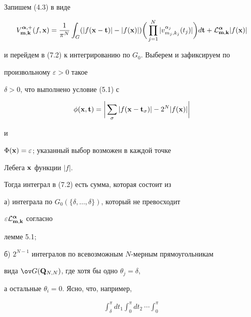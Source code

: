 \begin{pf}


Запишем (4.3) в виде


\begin{equation}


V^{{\boldsymbol {\alpha}},+}_{{\bold m},{\bold k}}(f,{\bold x})


=\frac{1}{\pi^N}\int_G (|f({\bold x}-{\bold t})|-|f({\bold x})|)


\bigg(\prod_{j=1}^N |v_{m_j,k_j}^{\alpha_j}(t_j)|\bigg)


d{\bold t}+{\cal L}_{{\bold m},{\bold k}}^{\boldsymbol {\alpha}}|f({\bold x})|


\end{equation}


и перейдем в (7.2) к интегрированию по $G_0$. Выберем и зафиксируем по 


произвольному $\varepsilon >0$ такое 


$\delta >0$, что выполнено условие (5.1) с


$$


\phi ({\bold x},{\bold t})=\bigg|\sum_\sigma


|f({\bold x}-{\bold t}_{\sigma})|-2^N |f({\bold x})|\bigg|


$$


и


$\Phi ({\bold x})=\varepsilon $; указанный выбор возможен в каждой точке 


Лебега ${\bold x}$ функции $|f|$.


Тогда интеграл в (7.2) есть сумма, которая состоит из





а) интеграла по $G_0 (\{\delta,\dotsc,\delta\})$, который не превосходит


$\varepsilon {\cal L}_{{\bold m},{\bold k}}^{\boldsymbol {\alpha}}$ согласно 


лемме 5.1;





б) $2^{N-1}$ интегралов по всевозможным $N$-мерным прямоугольникам


вида $\ov G ({\bold Q}_{N,N})$, где хотя бы одно $\theta_j=\delta$,


а остальные $\theta_i=0$. Ясно, что, например,


\begin{multline}


\int_\delta^\pi dt_1 \int_0^\pi dt_2\ \dotsb\int_0^\pi



\end{multline}
\end{pf}
